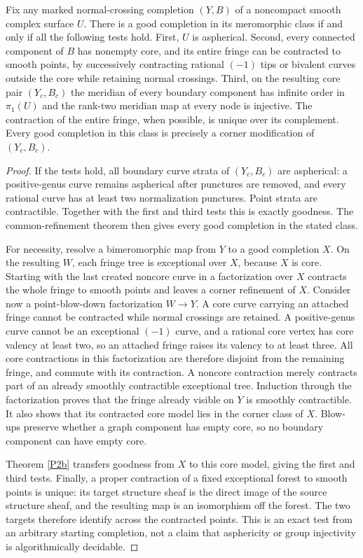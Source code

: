 \begin{theorem}\label{P3a-existence}
Fix any marked normal-crossing completion $(Y,B)$ of a noncompact
smooth complex surface $U$. There is a good completion in its
meromorphic class if and only if all the following tests hold.
First, $U$ is aspherical. Second, every connected component of
$B$ has nonempty core, and its entire fringe can be contracted
to smooth points, by successively contracting rational $(-1)$
tips or bivalent curves outside the core while retaining normal
crossings. Third, on the resulting core pair $(Y_c,B_c)$ the
meridian of every boundary component has infinite order in
$\pi _1(U)$ and the rank-two meridian map at every node is
injective. The contraction of the entire fringe, when possible,
is unique over its complement. Every good completion in this
class is precisely a corner modification of $(Y_c,B_c)$.
\end{theorem}
\begin{proof}
If the tests hold, all boundary curve strata of $(Y_c,B_c)$ are
aspherical: a positive-genus curve remains aspherical after
punctures are removed, and every rational curve has at least
two normalization punctures. Point strata are contractible.
Together with the first and third tests this is exactly
goodness. The common-refinement theorem then gives every good
completion in the stated class.

For necessity, resolve a bimeromorphic map from $Y$ to a good
completion $X$. On the resulting $W$, each fringe tree is
exceptional over $X$, because $X$ is core. Starting with the
last created noncore curve in a factorization over $X$ contracts
the whole fringe to smooth points and leaves a corner
refinement of $X$. Consider now a point-blow-down factorization
$W\to Y$. A core curve carrying an attached fringe cannot be
contracted while normal crossings are retained. A positive-genus
curve cannot be an exceptional $(-1)$ curve, and a rational core
vertex has core valency at least two, so an attached fringe
raises its valency to at least three. All core contractions in
this factorization are therefore disjoint from the remaining
fringe, and commute with its contraction. A noncore contraction
merely contracts part of an already smoothly contractible
exceptional tree. Induction through the factorization proves
that the fringe already visible on $Y$ is smoothly contractible.
It also shows that its contracted core model lies in the corner
class of $X$. Blow-ups preserve whether a graph component has
empty core, so no boundary component can have empty core.

Theorem \ref{P2b} transfers goodness from $X$ to this core model,
giving the first and third tests. Finally, a proper contraction
of a fixed exceptional forest to smooth points is unique: its
target structure sheaf is the direct image of the source
structure sheaf, and the resulting map is an isomorphism off
the forest. The two targets therefore identify across the
contracted points. This is an exact test from an arbitrary
starting completion, not a claim that asphericity or group
injectivity is algorithmically decidable.
\end{proof}

